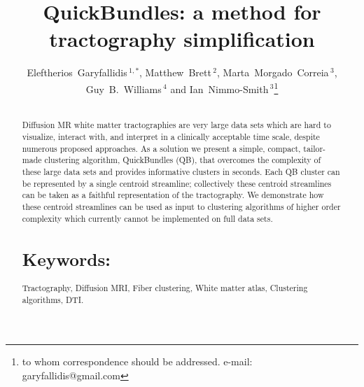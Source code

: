 \documentclass{bioinfo}
\begin{document}

\title[QuickBundles]{QuickBundles: a method for tractography simplification}

\author[Garyfallidis, Brett, Correia, Williams and
Nimmo-Smith]{Eleftherios~Garyfallidis\,$^{1,*}$, Matthew~Brett\,$^{2}$,
  Marta~Morgado~Correia\,$^{3}$, Guy~B.~Williams\,$^{4}$ and
  Ian~Nimmo-Smith\,$^{3}$\footnote{to whom correspondence should be
    addressed. e-mail: garyfallidis@gmail.com}}

\address{\,$^{1}$University of Cambridge, Cambridge, UK\\
  \,$^{2}$University of California, Henry H. Wheeler, Jr. Brain Imaging Center, Berkeley, CA.\\
  \,$^{3}$MRC Cognition and Brain Sciences Unit, Cambridge, UK.\\
  \,$^{4}$Wolfson Brain Imaging Centre, University of Cambridge,
  Cambridge, UK.}


\history{}

\editor{}

\maketitle

\begin{abstract}

\section{}
Diffusion MR white matter tractographies are very large data sets which
are hard to visualize, interact with, and interpret in a clinically
acceptable time scale, despite numerous proposed approaches. As a
solution we present a simple, compact, tailor-made clustering algorithm,
QuickBundles (QB), that overcomes the complexity of these large data
sets and provides informative clusters in seconds. Each QB cluster can
be represented by a single centroid streamline; collectively these
centroid streamlines can be taken as a faithful representation of the
tractography. We demonstrate how these centroid streamlines can be used
as input to clustering algorithms of higher order complexity which
currently cannot be implemented on full data sets.


\section{Keywords:} Tractography, Diffusion MRI, Fiber clustering, White
matter atlas,
Clustering algorithms, DTI.

\end{abstract}
\end{document}
